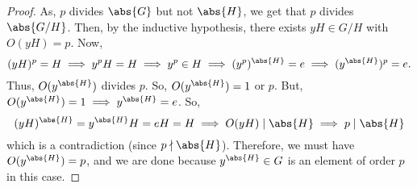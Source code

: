 \documentclass[11pt]{penrose}
\begin{document}
\begin{proof}
    As, $p$ divides $\abs{G}$ but not $\abs{H}$, we get that $p$ divides $\abs{G/H}$. Then, by the inductive hypothesis, there exists $yH \in G/H$ with $O(yH) = p$. Now,
    \begin{equation*}
        (yH)^{p} = H
        \implies
        y^{p} H = H
        \implies
        y^{p} \in H
        \implies
        (y^{p})^{\abs{H}} = e
        \implies
        (y^{\abs{H}})^{p} = e.
    \end{equation*}
    Thus, $O(y^{\abs{H}})$ divides $p$. So, $O(y^{\abs{H}}) = 1$ or $p$. But, $O(y^{\abs{H}}) = 1 \implies y^{\abs{H}} = e$. So,
    \begin{equation*}
        (yH)^{\abs{H}} = y^{\abs{H}}H = eH = H
        \implies
        O(yH) \mid \abs{H}
        \implies
        p \mid \abs{H}
    \end{equation*}
    which is a contradiction (since $p \nmid \abs{H}$). Therefore, we must have $O(y^{\abs{H}}) = p$, and we are done because $y^{\abs{H}} \in G$ is an element of order $p$ in this case.
\end{proof}
\end{document}
